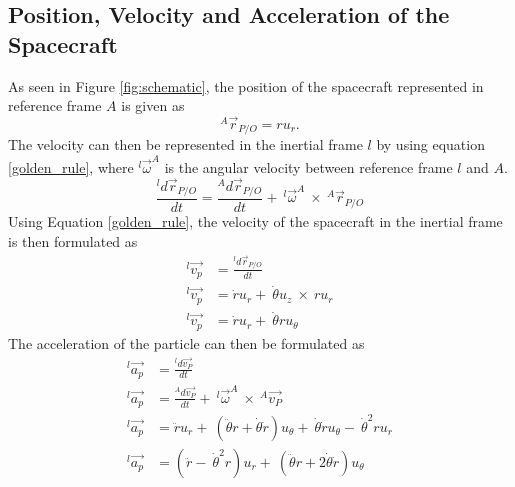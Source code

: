 \documentclass[]{article}
\begin{document}
\subsection{Position, Velocity and Acceleration of the Spacecraft}
As seen in Figure \ref{fig:schematic}, the position of the spacecraft represented in reference frame \(A\) is given as 
\begin{equation} \label{position}
	^A\vec{r}_{P/O} = ru_{r}.
\end{equation}
The velocity can then be represented in the inertial frame \(l\) by using equation \ref{golden_rule}, where \(^l\vec{\omega}^A\) is the angular velocity between reference frame \(l\) and \(A\).
\begin{equation} \label{golden_rule}
	\frac{^ld\vec{r}_{P/O}}{dt} = \frac{^Ad\vec{r}_{P/O}}{dt} +\ ^l\vec{\omega}^A\  \times\  ^A\vec{r}_{P/O} 
\end{equation}
Using Equation \ref{golden_rule}, the velocity of the spacecraft in the inertial frame is then formulated as
\begin{align}
	^l\vec{v_{p}} &= \frac{^ld\vec{r}_{P/O}}{dt} \nonumber\\
	^l\vec{v_{p}} &= \dot{r}u_{r} +\ \dot{\theta}u_{z}\ \times\ ru_{r} \nonumber\\
	^l\vec{v_{p}} &= \dot{r}u_{r} +\ \dot{\theta}ru_{\theta} \label{velocity}
\end{align}
The acceleration of the particle can then be formulated as 
\begin{align}
    ^l\vec{a_{p}} &= \frac{^ld\vec{v_{P}}}{dt} \nonumber\\
	^l\vec{a_{p}} &= \frac{^Ad\vec{v_{P}}}{dt} +\ ^l\vec{\omega}^A\  \times\  ^A\vec{v_{P}} \nonumber\\
	^l\vec{a_{p}} &= \ddot{r}u_{r} +\ (\ddot{\theta}r+\dot{\theta}\dot{r})u_{\theta} +\ \dot{\theta}\dot{r}u_{\theta} -\ \dot{\theta}^2ru_{r} \nonumber\\
	^l\vec{a_{p}} &= (\ddot{r} -\ \dot{\theta}^2r)u_{r} +\ (\ddot{\theta}r+2\dot{\theta}\dot{r})u_{\theta}   \label{acceleration}
\end{align}

\end{document}

